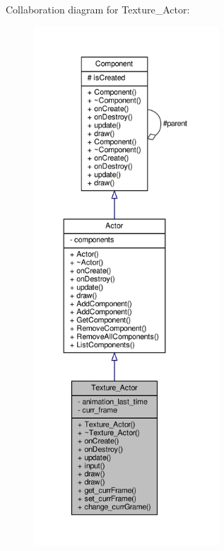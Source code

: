 Collaboration diagram for Texture\+\_\+\+Actor\+:
\nopagebreak
\begin{figure}[H]
\begin{center}
\leavevmode
\includegraphics[height=550pt]{classTexture__Actor__coll__graph}
\end{center}
\end{figure}
